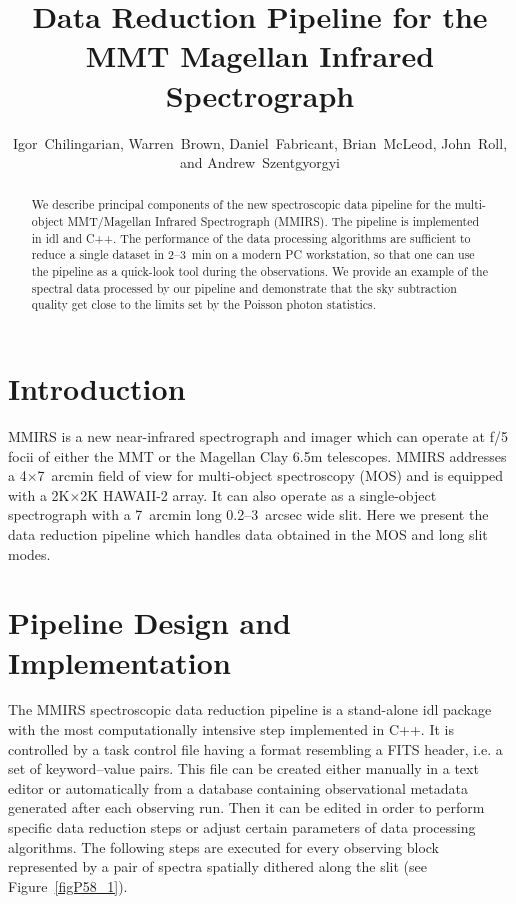 
\resetcounters




\title{Data Reduction Pipeline for the MMT Magellan Infrared Spectrograph
}
\author{Igor~Chilingarian, 
Warren~Brown, Daniel~Fabricant, 
Brian~McLeod, John~Roll,
and Andrew~Szentgyorgyi
}


\begin{abstract} We describe principal components of the new spectroscopic
data pipeline for the multi-object MMT/Magellan Infrared Spectrograph
(MMIRS).  The pipeline is implemented in {\sc idl} and {\sc C++}.  The
performance of the data processing algorithms are sufficient to reduce a
single dataset in 2--3~min on a modern PC workstation, so that one can use
the pipeline as a quick-look tool during the observations.  We provide an
example of the spectral data processed by our pipeline and demonstrate that
the sky subtraction quality get close to the limits set by the Poisson
photon statistics.
\end{abstract}

\section{Introduction} 

MMIRS \citep{McLeod+12} is a new near-infrared spectrograph and imager which
can operate at f/5 focii of either the MMT or the Magellan Clay 6.5m
telescopes.  MMIRS addresses a 4$\times$7~arcmin field of view for
multi-object spectroscopy (MOS) and is equipped with a 2K$\times$2K HAWAII-2
array.  It can also operate as a single-object spectrograph with a 7~arcmin
long 0.2--3~arcsec wide slit.  Here we present the data reduction pipeline
which handles data obtained in the MOS and long slit modes.

\section{Pipeline Design and Implementation}

The MMIRS spectroscopic data reduction pipeline is a stand-alone {\sc idl}
package with the most computationally intensive step implemented in {\sc
C++}.  It is controlled by a task control file having a format resembling a
FITS header, i.e.  a set of keyword--value pairs.  This file can be created
either manually in a text editor or automatically from a database containing
observational metadata generated after each observing run.  Then it can be
edited in order to perform specific data reduction steps or adjust certain
parameters of data processing algorithms.  The following steps are
executed for every observing block represented by a pair of spectra
spatially dithered along the slit (see Figure~\ref{figP58_1}).

